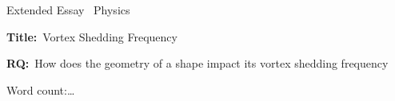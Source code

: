 \documentclass[a4paper]{report}
\begin{document}
\begin{titlepage}
    \begin{center}
            Extended Essay \
            Physics

            \vspace*{4cm}

            \textbf{Title:}\
            Vortex Shedding Frequency
            \vspace{1cm}

            \textbf{RQ:}\
            How does the geometry of a shape impact its vortex shedding frequency
            \vspace{4cm}

            Word count:\ldots
            \vfill

            \vspace{0.1cm}
    \end{center}
\end{titlepage}

\tableofcontents
\listoffigures


\appendix

\end{document}
